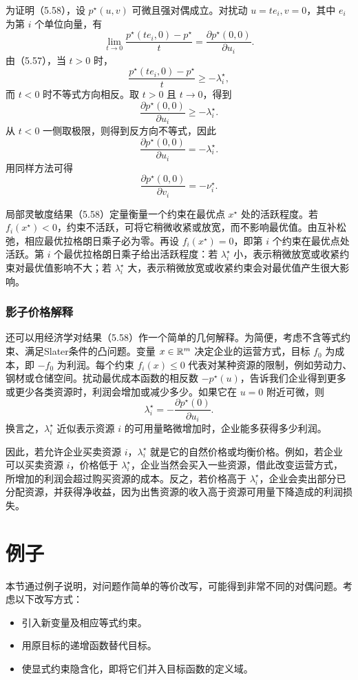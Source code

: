 为证明（5.58），设 $p^\star(u,v)$ 可微且强对偶成立。对扰动 $u=te_i,v=0$，其中 $e_i$ 为第 $i$ 个单位向量，有
\[
\lim_{t\to0}\frac{p^\star(te_i,0)-p^\star}{t}
=\frac{\partial p^\star(0,0)}{\partial u_i}.
\]
由（5.57），当 $t>0$ 时，
\[
\frac{p^\star(te_i,0)-p^\star}{t}\ge-\lambda_i^\star,
\]
而 $t<0$ 时不等式方向相反。取 $t>0$ 且 $t\to0$，得到
\[
\frac{\partial p^\star(0,0)}{\partial u_i}\ge-\lambda_i^\star.
\]
从 $t<0$ 一侧取极限，则得到反方向不等式，因此
\[
\frac{\partial p^\star(0,0)}{\partial u_i}=-\lambda_i^\star.
\]
用同样方法可得
\[
\frac{\partial p^\star(0,0)}{\partial v_i}=-\nu_i^\star.
\]

局部灵敏度结果（5.58）定量衡量一个约束在最优点 $x^\star$ 处的活跃程度。若 $f_i(x^\star)<0$，约束不活跃，可将它稍微收紧或放宽，而不影响最优值。由互补松弛，相应最优拉格朗日乘子必为零。再设 $f_i(x^\star)=0$，即第 $i$ 个约束在最优点处活跃。第 $i$ 个最优拉格朗日乘子给出活跃程度：若 $\lambda_i^\star$ 小，表示稍微放宽或收紧约束对最优值影响不大；若 $\lambda_i^\star$ 大，表示稍微放宽或收紧约束会对最优值产生很大影响。

\subsubsection*{影子价格解释}
还可以用经济学对结果（5.58）作一个简单的几何解释。为简便，考虑不含等式约束、满足Slater条件的凸问题。变量 $x\in\mathbb R^m$ 决定企业的运营方式，目标 $f_0$ 为成本，即 $-f_0$ 为利润。每个约束 $f_i(x)\le0$ 代表对某种资源的限制，例如劳动力、钢材或仓储空间。扰动最优成本函数的相反数 $-p^\star(u)$，告诉我们企业得到更多或更少各类资源时，利润会增加或减少多少。如果它在 $u=0$ 附近可微，则
\[
\lambda_i^\star=-\frac{\partial p^\star(0)}{\partial u_i}.
\]
换言之，$\lambda_i^\star$ 近似表示资源 $i$ 的可用量略微增加时，企业能多获得多少利润。

因此，若允许企业买卖资源 $i$，$\lambda_i^\star$ 就是它的自然价格或均衡价格。例如，若企业可以买卖资源 $i$，价格低于 $\lambda_i^\star$，企业当然会买入一些资源，借此改变运营方式，所增加的利润会超过购买资源的成本。反之，若价格高于 $\lambda_i^\star$，企业会卖出部分已分配资源，并获得净收益，因为出售资源的收入高于资源可用量下降造成的利润损失。

\section{例子}
本节通过例子说明，对问题作简单的等价改写，可能得到非常不同的对偶问题。考虑以下改写方式：
\begin{itemize}
\item 引入新变量及相应等式约束。
\item 用原目标的递增函数替代目标。
\item 使显式约束隐含化，即将它们并入目标函数的定义域。
\end{itemize}

